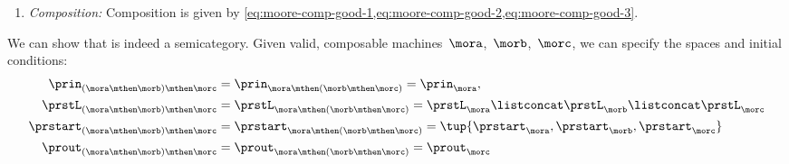 {\begin{definition}[\Moore]
\begin{enumerate}
            \item \emph{Composition:}
                  Composition is given by \cref{eq:moore-comp-good-1,eq:moore-comp-good-2,eq:moore-comp-good-3}.
        \end{enumerate}
    \end{definition}
    We can show that \Moore is indeed a semicategory.
    Given valid, composable machines~$\mora$,~$\morb$,~$\morc$, we can specify the spaces and initial conditions:
    \begin{equation*}
        \label{eq:moore_assoc_spaces}
        \begin{aligned}
            \prin_{(\mora \mthen \morb)\mthen \morc}    & =\prin_{\mora \mthen (\morb \mthen \morc)}=\prin_{\mora}, \\
            \prstL_{(\mora \mthen \morb)\mthen \morc}   & =\prstL_{\mora \mthen (\morb \mthen \morc)}=  \prstL_{\mora} \listconcat \prstL_{\morb} \listconcat  \prstL_{\morc} \\
            \prstart_{(\mora \mthen \morb)\mthen \morc} & =\prstart_{\mora \mthen (\morb \mthen \morc)}=\tup{\prstart_\mora,\prstart_\morb,\prstart_\morc} \\
            \prout_{(\mora \mthen \morb)\mthen \morc}   & =\prout_{\mora \mthen (\morb \mthen \morc)}=\prout_\morc
        \end{aligned}
    \end{equation*}

}
